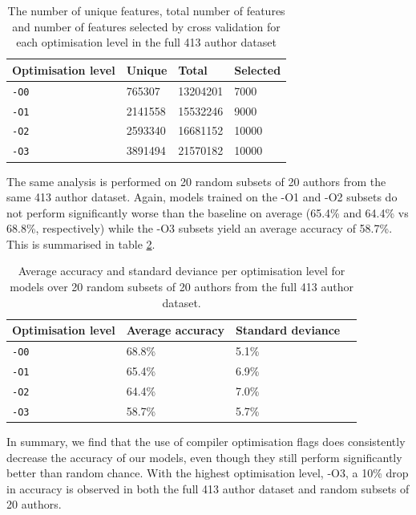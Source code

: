 \documentclass[a4paper,11pt]{kth-mag}
\begin{document}
\begin{table}[!htb]
    \centering
        \begin{tabular}{ l l l l }
        Optimisation level & Unique & Total & Selected \\ \hline
        \lstinline{-O0} & 765307 & 13204201 & 7000 \\
        \lstinline{-O1} & 2141558 & 15532246 & 9000 \\
        \lstinline{-O2} & 2593340 & 16681152 & 10000 \\
        \lstinline{-O3} & 3891494 & 21570182 & 10000
        \end{tabular}
    \caption{The number of unique features, total number of features and number
    of features selected by cross validation for each optimisation level in the
    full 413 author dataset}
    \label{tab:413-results-features}
\end{table}

The same analysis is performed on 20 random subsets of 20 authors from the same
413 author dataset. Again, models trained on the -O1 and -O2 subsets do not
perform significantly worse than the baseline on average (65.4\% and 64.4\%
vs 68.8\%, respectively) while the -O3 subsets yield an average accuracy of
58.7\%. This is summarised in table \ref{tab:20-results}.

\begin{table}[!htb]
    \centering
        \begin{tabular}{ l l l l }
        Optimisation level & Average accuracy & Standard deviance \\
        \hline
        \lstinline{-O0} & 68.8\% & 5.1\% \\
        \lstinline{-O1} & 65.4\% & 6.9\% \\
        \lstinline{-O2} & 64.4\% & 7.0\% \\
        \lstinline{-O3} & 58.7\% & 5.7\% 
        \end{tabular}
    \caption{Average accuracy and standard deviance per optimisation level for
    models over 20 random subsets of 20 authors from the full 413 author
    dataset.}
    \label{tab:20-results}
\end{table}

In summary, we find that the use of compiler optimisation flags does
consistently decrease the accuracy of our models, even though they still
perform significantly better than random chance. With the highest optimisation
level, -O3, a 10\% drop in accuracy is observed in both the full 413 author
dataset and random subsets of 20 authors.
\end{document}
